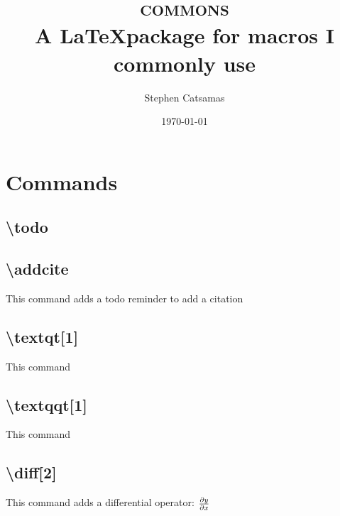 \documentclass{article}
\title{\Huge\textsc{commons} \\\vspace*{1 em}
    \large A \LaTeX package for macros I commonly use}
\author{Stephen Catsamas}
\date{\today}
\begin{document}
\maketitle
\tableofcontents

\section{Commands}
\subsection{\textbackslash todo}

\subsection{\textbackslash addcite}
    This command adds a todo reminder to add a citation \addcite{}

\subsection{\textbackslash textqt[1]}
    This command 

\subsection{\textbackslash textqqt[1]}
    This command 

\subsection{\textbackslash diff[2]}
    This command adds a differential operator: $\frac{\partial y}{\partial x}$
\end{document}
